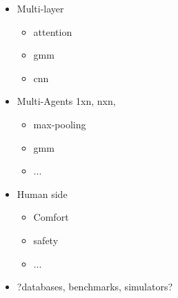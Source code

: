 \begin{itemize}
    \item Multi-layer
    \begin{itemize}
        \item attention
        \item gmm
        \item cnn
    \end{itemize}

    \item Multi-Agents
    1xn, nxn, 
    \begin{itemize}
        \item max-pooling
        \item gmm
        \item ...
    \end{itemize}

    \item Human side
    \begin{itemize}
        \item Comfort
        \item safety
        \item ...
    \end{itemize}

    \item ?databases, benchmarks, simulators?
\end{itemize}